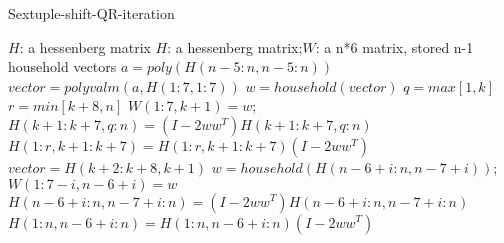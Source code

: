 \renewcommand{\algorithmicrequire}{\textbf{Input:}}
\renewcommand{\algorithmicensure}{\textbf{Output:}}
\begin{breakablealgorithm}
  \caption{Sextuple-shift-QR-iteration}
  \label{alg::Sextuple-shift-QR-iteration}
  \begin{algorithmic}[1]
    \Require $H$: a hessenberg matrix
    \Ensure $H$: a hessenberg matrix;$W$: a n*6 matrix, stored n-1 household vectors
    \State\(a=poly(H(n-5:n,n-5:n))\)
    \State\(vector=polyvalm(a,H(1:7,1:7))\)
      \State\(w=household(vector)\)
      \State\(q=max[1,k]\)
      \State\(r=min[k+8,n]\)
      \State\(W(1:7,k+1)=w\);   
      \State\(H(k+1:k+7,q:n)=(I-2w{w^T})H(k+1:k+7,q:n)\)
      \State\(H(1:r,k+1:k+7)=H(1:r,k+1:k+7)(I-2w{w^T})\)
      \State \(vector=H(k+2:k+8,k+1)\)
      \EndIf
    \EndFor
      \State\(w=household(H(n-6+i:n,n-7+i))\);
      \State\(W(1:7-i,n-6+i)=w\)
      \State\(H(n-6+i:n,n-7+i:n)=(I-2w{w^T})H(n-6+i:n,n-7+i:n)\)
      \State\(H(1:n,n-6+i:n)=H(1:n,n-6+i:n)(I-2w{w^T})\)
    \EndFor
  \end{algorithmic}
\end{breakablealgorithm}